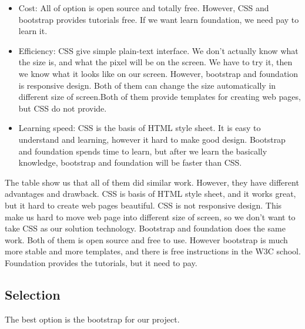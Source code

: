     \begin{itemize}
      \item Cost: All of option is open source and totally free. However, CSS and bootstrap provides tutorials free. If we want learn foundation, we need pay to learn it.
      \item Efficiency: CSS give simple plain-text interface. We don't actually know what the size is, and what the pixel will be on the screen. We have to try it, then we know what it looks like on our screen. However, bootstrap and foundation is responsive design. Both of them can change the size automatically in different size of screen.Both of them provide templates for creating web pages, but CSS do not provide.
      \item Learning speed: CSS is the basis of HTML style sheet. It is easy to understand and learning, however it hard to make good design. Bootstrap and foundation spends time to learn, but after we learn the basically knowledge, bootstrap and foundation will be faster than CSS.
    \end{itemize}

The table show us that all of them did similar work. However, they have different advantages and drawback. CSS is basis of HTML style sheet, and it works great, but it hard to create web pages beautiful. CSS is not responsive design. This make us hard to move web page into different size of screen, so we don't want to take CSS as our solution technology. Bootstrap and foundation does the same work. Both of them is open source and free to use. However bootstrap is much more stable and more templates, and there is free instructions in the W3C school. Foundation provides the tutorials, but it need to pay.

\subsection{Selection}
The best option is the bootstrap for our project.
